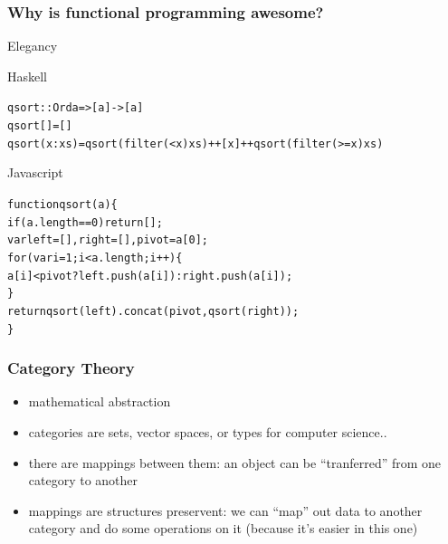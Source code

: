 \documentclass[12pt, xcolor=table]{beamer}
\begin{document}
\begin{frame}
    \frametitle{Why is functional programming awesome?}
    \begin{block}{Elegancy}
        \begin{block}{Haskell}
                \begin{alltt}
                    \begin{tiny}
                    qsort :: Ord a => [a] -> [a]
                    \newline
                    qsort []     = []
                    \newline
                    qsort (x:xs) = qsort (filter (< x) xs) ++ [x] ++ qsort (filter (>= x) xs)
                \end{tiny}
                \end{alltt}
        \end{block}
        \begin{block}{Javascript}
                \begin{alltt}
                    \begin{tiny}
                    function qsort(a) \{ \\
                        if (a.length == 0) return []; \\

                        var left = [], right = [], pivot = a[0];\\

                        for (var i = 1; i < a.length; i++) \{ \\
                            a[i] < pivot ? left.push(a[i]) : right.push(a[i]); \\
                        \} \\

                        return qsort(left).concat(pivot, qsort(right)); \\
                    \}
                    \end{tiny}
                \end{alltt}
        \end{block}
    \end{block}
\end{frame}

\begin{frame}
    \frametitle{Category Theory}
        \begin{itemize}
            \item mathematical abstraction
            \item categories are sets, vector spaces, or types for computer science..
            \item there are mappings between them: an object can be ``tranferred'' from one category to another
            \item  mappings are structures preservent: we can ``map'' out data to another category and do some operations on it (because it's easier in this one)
        \end{itemize}
\end{frame}
\end{document}
